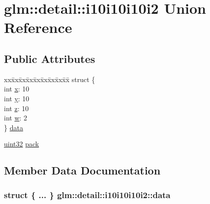 \hypertarget{unionglm_1_1detail_1_1i10i10i10i2}{}\section{glm\+:\+:detail\+:\+:i10i10i10i2 Union Reference}
\label{unionglm_1_1detail_1_1i10i10i10i2}
\subsection*{Public Attributes}
\begin{DoxyCompactItemize}
\item 
\begin{tabbing}
xx\=xx\=xx\=xx\=xx\=xx\=xx\=xx\=xx\=\kill
struct \{\\
\>int \hyperlink{unionglm_1_1detail_1_1i10i10i10i2_a290d519ee2feaba6ae4b5244d5d90e7b}{x}: 10\\
\>int \hyperlink{unionglm_1_1detail_1_1i10i10i10i2_ae76bb89adeb66d1ee5bb2b265e87fc1b}{y}: 10\\
\>int \hyperlink{unionglm_1_1detail_1_1i10i10i10i2_a95398090414de32eaaf9cb3c3bd3fa48}{z}: 10\\
\>int \hyperlink{unionglm_1_1detail_1_1i10i10i10i2_a20c12acbdb874a476b158164acd17abd}{w}: 2\\
\} \hyperlink{unionglm_1_1detail_1_1i10i10i10i2_a9eaf271278a4d21a0728d2d8440bb534}{data}\\

\end{tabbing}\item 
\hyperlink{group__gtc__type__precision_ga202b6a53c105fcb7e531f9b443518451}{uint32} \hyperlink{unionglm_1_1detail_1_1i10i10i10i2_a24e2dc324c86589d568dc330904c859a}{pack}
\end{DoxyCompactItemize}


\subsection{Member Data Documentation}
\hypertarget{unionglm_1_1detail_1_1i10i10i10i2_a9eaf271278a4d21a0728d2d8440bb534}{}
\subsubsection[{data}]{\setlength{\rightskip}{0pt plus 5cm}struct \{ ... \}   glm\+::detail\+::i10i10i10i2\+::data}\label{unionglm_1_1detail_1_1i10i10i10i2_a9eaf271278a4d21a0728d2d8440bb534}
\hypertarget{unionglm_1_1detail_1_1i10i10i10i2_a24e2dc324c86589d568dc330904c859a}{}
